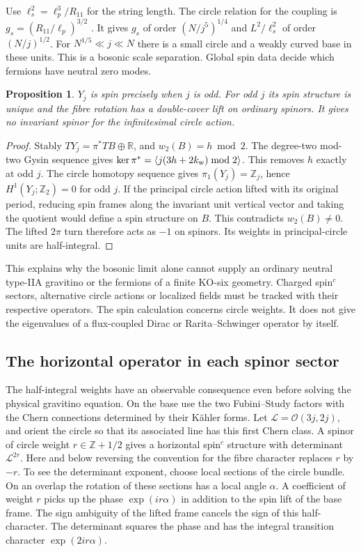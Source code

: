 \documentclass[aps,prd,reprint,onecolumn,nofootinbib,amsmath,amssymb]{revtex4-2}
\newtheorem{proposition}{Proposition}
\begin{document}
Use $\ell_s^2=\ell_p^3/R_{11}$ for the string length. The circle relation for the coupling is $g_s=(R_{11}/\ell_p)^{3/2}$ \cite{Witten1995Circle}. It gives $g_s$ of order $(N/j^5)^{1/4}$ and $L^2/\ell_s^2$ of order $(N/j)^{1/2}$. For $N^{1/5}\ll j\ll N$ there is a small circle and a weakly curved base in these units. This is a bosonic scale separation. Global spin data decide which fermions have neutral zero modes.

\begin{proposition}
$Y_j$ is spin precisely when $j$ is odd. For odd $j$ its spin structure is unique and the fibre rotation has a double-cover lift on ordinary spinors. It gives no invariant spinor for the infinitesimal circle action.
\end{proposition}
\begin{proof}
Stably $TY_j=\pi^*TB\oplus\mathbb R$, and $w_2(B)=h\bmod2$. The degree-two mod-two Gysin sequence gives $\ker\pi^*=\langle j(3h+2k_{\rm w})\bmod2\rangle$. This removes $h$ exactly at odd $j$. The circle homotopy sequence gives $\pi_1(Y_j)=\mathbb Z_j$, hence $H^1(Y_j;\mathbb Z_2)=0$ for odd $j$. If the principal circle action lifted with its original period, reducing spin frames along the invariant unit vertical vector and taking the quotient would define a spin structure on $B$. This contradicts $w_2(B)\ne0$. The lifted $2\pi$ turn therefore acts as $-1$ on spinors. Its weights in principal-circle units are half-integral.
\end{proof}

This explains why the bosonic limit alone cannot supply an ordinary neutral type-IIA gravitino or the fermions of a finite KO-six geometry. Charged spin$^c$ sectors, alternative circle actions or localized fields must be tracked with their respective operators. The spin calculation concerns circle weights. It does not give the eigenvalues of a flux-coupled Dirac or Rarita--Schwinger operator by itself.

\subsection{The horizontal operator in each spinor sector}
The half-integral weights have an observable consequence even before solving the physical gravitino equation. On the base use the two Fubini--Study factors with the Chern connections determined by their Kähler forms. Let $\mathcal L=\mathcal O(3j,2j)$, and orient the circle so that its associated line has this first Chern class. A spinor of circle weight $r\in\mathbb Z+1/2$ gives a horizontal spin$^c$ structure with determinant $\mathcal L^{2r}$. Here and below reversing the convention for the fibre character replaces $r$ by $-r$. To see the determinant exponent, choose local sections of the circle bundle. On an overlap the rotation of these sections has a local angle $\alpha$. A coefficient of weight $r$ picks up the phase $\exp(ir\alpha)$ in addition to the spin lift of the base frame. The sign ambiguity of the lifted frame cancels the sign of this half-character. The determinant squares the phase and has the integral transition character $\exp(2ir\alpha)$.
\end{document}
